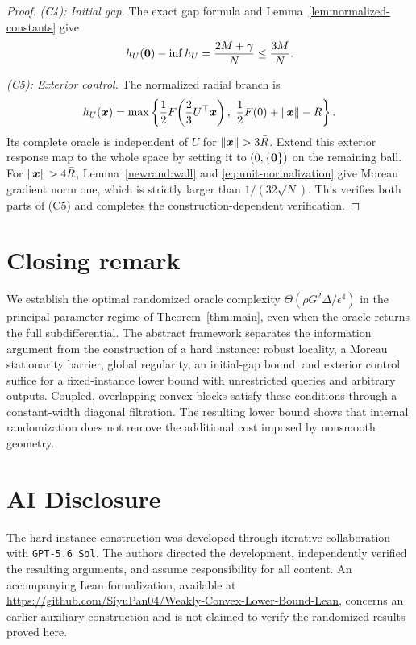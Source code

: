 \begin{proof}
\emph{(C4): Initial gap.}
The exact gap formula and Lemma~\ref{lem:normalized-constants} give
\[
 h_U({\mathbf 0})-\inf h_U
 =\frac{2M+\gamma}{N}\le\frac{3M}{N}.
\]

\emph{(C5): Exterior control.}
The normalized radial branch is
\[
 h_U(\bm{x})=\max\left\{
 \frac12F\!\left(\frac23U^\top\bm{x}\right),\ \frac12F(0)+\|\bm{x}\|-\bar R
 \right\}.
\]
Its complete oracle is independent of $U$ for
$\|\x\|>3\bar R$. Extend this exterior response map to the
whole space by setting it to $(0,\{{\mathbf 0}\})$ on the remaining ball.
For $\|\x\|>4\bar R$,
Lemma~\ref{newrand:wall} and \eqref{eq:unit-normalization}
give Moreau gradient norm one, which is strictly larger than
$1/(32\sqrt N)$. This verifies both parts of \textnormal{(C5)}
and completes the construction-dependent verification.
\end{proof}

\endgroup


\begingroup
\color{black}
\section{Closing remark}
\label{sec:close}
We establish the optimal randomized oracle complexity
$\Theta(\rho G^2\Delta/\epsilon^4)$ in the principal parameter
regime of Theorem~\ref{thm:main}, even when the oracle returns the
full subdifferential. The abstract framework separates the information
argument from the construction of a hard instance: robust locality,
a Moreau stationarity barrier, global regularity, an initial-gap
bound, and exterior control suffice for a fixed-instance lower bound with unrestricted
queries and arbitrary outputs. Coupled, overlapping convex blocks
satisfy these conditions through a constant-width diagonal filtration.
The resulting lower bound shows that internal randomization does not
remove the additional cost imposed by nonsmooth geometry.
\endgroup





\section*{AI Disclosure}
The hard instance construction was developed through iterative collaboration with \texttt{GPT-5.6 Sol}.
The authors directed the development, independently verified the resulting arguments, and assume responsibility for all content. {\color{black}An accompanying
Lean formalization, available at
\url{https://github.com/SiyuPan04/Weakly-Convex-Lower-Bound-Lean},
concerns an earlier auxiliary construction and is not claimed to
verify the randomized results proved here.}


